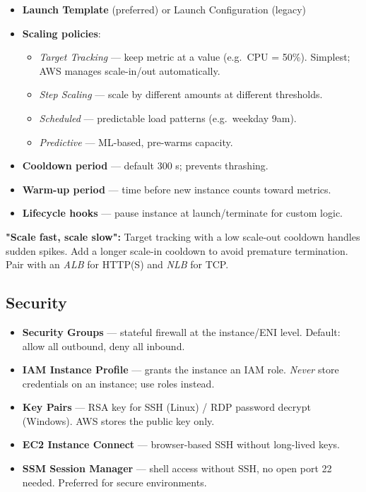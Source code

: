 \begin{keyfacts}
\begin{itemize}
  \item \textbf{Launch Template} (preferred) or Launch Configuration (legacy)
  \item \textbf{Scaling policies}:
    \begin{itemize}
      \item \emph{Target Tracking} — keep metric at a value (e.g.\ CPU = 50\%).
            Simplest; AWS manages scale-in/out automatically.
      \item \emph{Step Scaling} — scale by different amounts at different thresholds.
      \item \emph{Scheduled} — predictable load patterns (e.g.\ weekday 9am).
      \item \emph{Predictive} — ML-based, pre-warms capacity.
    \end{itemize}
  \item \textbf{Cooldown period} — default 300 s; prevents thrashing.
  \item \textbf{Warm-up period} — time before new instance counts toward metrics.
  \item \textbf{Lifecycle hooks} — pause instance at launch/terminate for custom logic.
\end{itemize}
\end{keyfacts}

\begin{examtip}
  \textbf{"Scale fast, scale slow":} Target tracking with a low scale-out cooldown
  handles sudden spikes. Add a longer scale-in cooldown to avoid premature
  termination. Pair with an \emph{ALB} for HTTP(S) and \emph{NLB} for TCP.
\end{examtip}

\subsection{Security}

\begin{keyfacts}
\begin{itemize}
  \item \textbf{Security Groups} — stateful firewall at the instance/ENI level.
        Default: allow all outbound, deny all inbound.
  \item \textbf{IAM Instance Profile} — grants the instance an IAM role.
        \emph{Never} store credentials on an instance; use roles instead.
  \item \textbf{Key Pairs} — RSA key for SSH (Linux) / RDP password decrypt (Windows).
        AWS stores the public key only.
  \item \textbf{EC2 Instance Connect} — browser-based SSH without long-lived keys.
  \item \textbf{SSM Session Manager} — shell access without SSH, no open port 22
        needed. Preferred for secure environments.
\end{itemize}
\end{keyfacts}

